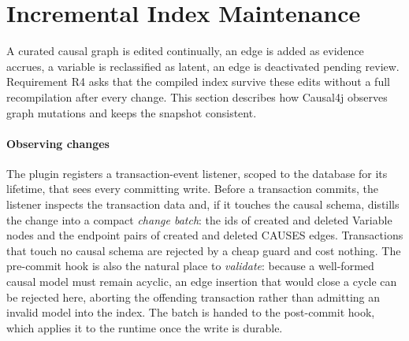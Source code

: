\section{Incremental Index Maintenance}\label{sec:incr}

A curated causal graph is edited continually, an edge is added as evidence
accrues, a variable is reclassified as latent, an edge is deactivated pending
review. Requirement R4 asks that the compiled index survive these edits without
a full recompilation after every change. This section describes how Causal4j
observes graph mutations and keeps the snapshot consistent.

\paragraph{Observing changes}
The plugin registers a transaction-event listener, scoped to the database for its
lifetime, that sees every committing write. Before a transaction commits, the
listener inspects the transaction data and, if it touches the causal schema,
distills the change into a compact \emph{change batch}: the ids of created and
deleted \textsf{Variable} nodes and the endpoint pairs of created and deleted
\textsf{CAUSES} edges. Transactions that touch no causal schema are rejected by a
cheap guard and cost nothing. The pre-commit hook is also the natural place to
\emph{validate}: because a well-formed causal model must remain acyclic, an edge
insertion that would close a cycle can be rejected here, aborting the offending
transaction rather than admitting an invalid model into the index. The batch is
handed to the post-commit hook, which applies it to the runtime once the write is
durable.

